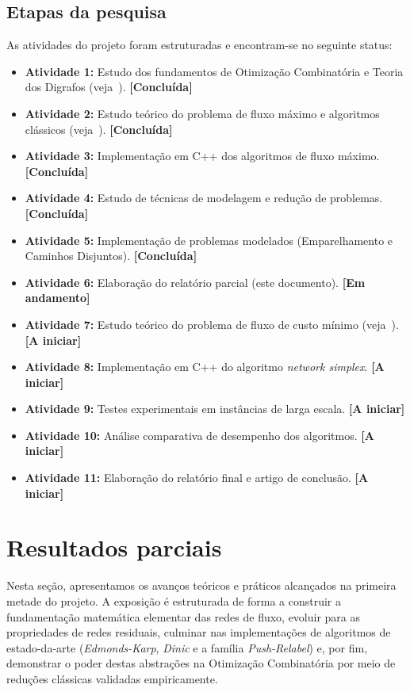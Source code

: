 \documentclass[12pt,a4paper]{article}
\begin{document}
\subsection{Etapas da pesquisa}
As atividades do projeto foram estruturadas e encontram-se no seguinte status:
\begin{itemize}
    \item \textbf{Atividade 1:} Estudo dos fundamentos de Otimização Combinatória e Teoria dos Digrafos (veja~\cite{cook1998combinatorial}). \textbf{[Concluída]}
    \item \textbf{Atividade 2:} Estudo teórico do problema de fluxo máximo e algoritmos clássicos (veja~\cite{ford1956maximal, edmonds1972theoretical, dinic1970algorithm, goldberg1988new}). \textbf{[Concluída]}
    \item \textbf{Atividade 3:} Implementação em C++ dos algoritmos de fluxo máximo. \textbf{[Concluída]}
    \item \textbf{Atividade 4:} Estudo de técnicas de modelagem e redução de problemas. \textbf{[Concluída]}
    \item \textbf{Atividade 5:} Implementação de problemas modelados (Emparelhamento e Caminhos Disjuntos). \textbf{[Concluída]}
    \item \textbf{Atividade 6:} Elaboração do relatório parcial (este documento). \textbf{[Em andamento]}
    \item \textbf{Atividade 7:} Estudo teórico do problema de fluxo de custo mínimo (veja~\cite{cook1998combinatorial}). \textbf{[A iniciar]}
    \item \textbf{Atividade 8:} Implementação em C++ do algoritmo \textit{network simplex}. \textbf{[A iniciar]}
    \item \textbf{Atividade 9:} Testes experimentais em instâncias de larga escala. \textbf{[A iniciar]}
    \item \textbf{Atividade 10:} Análise comparativa de desempenho dos algoritmos. \textbf{[A iniciar]}
    \item \textbf{Atividade 11:} Elaboração do relatório final e artigo de conclusão. \textbf{[A iniciar]}
\end{itemize}

\section{Resultados parciais}

Nesta seção, apresentamos os avanços teóricos e práticos alcançados na primeira metade do projeto. A exposição é estruturada de forma a construir a fundamentação matemática elementar das redes de fluxo, evoluir para as propriedades de redes residuais, culminar nas implementações de algoritmos de estado-da-arte (\textit{Edmonds-Karp}, \textit{Dinic} e a família \textit{Push-Relabel}) e, por fim, demonstrar o poder destas abstrações na Otimização Combinatória por meio de reduções clássicas validadas empiricamente.
\end{document}
